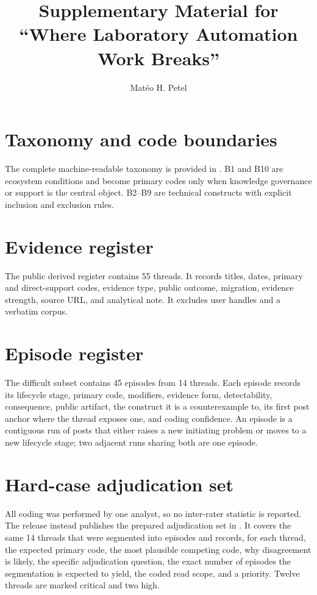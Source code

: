 \documentclass[preprint,12pt]{elsarticle}
\begin{document}
\begin{frontmatter}
\title{Supplementary Material for ``Where Laboratory Automation Work Breaks''}
\author{Mat\'eo H. Petel}
\end{frontmatter}

\renewcommand{\thetable}{S\arabic{table}}
\renewcommand{\thefigure}{S\arabic{figure}}
\renewcommand{\thesection}{S\arabic{section}}

\section{Taxonomy and code boundaries}
The complete machine-readable taxonomy is provided in . B1 and B10 are ecosystem conditions and become primary codes only when knowledge governance or support is the central object. B2--B9 are technical constructs with explicit inclusion and exclusion rules.

\section{Evidence register}
The public derived register contains 55 threads. It records titles, dates, primary and direct-support codes, evidence type, public outcome, migration, evidence strength, source URL, and analytical note. It excludes user handles and a verbatim corpus.



\section{Episode register}
The difficult subset contains 45 episodes from 14 threads. Each episode records its lifecycle stage, primary code, modifiers, evidence form, detectability, consequence, public artifact, the construct it is a counterexample to, its first post anchor where the thread exposes one, and coding confidence. An episode is a contiguous run of posts that either raises a new initiating problem or moves to a new lifecycle stage; two adjacent runs sharing both are one episode.

\section{Hard-case adjudication set}
\label{sec:s-adjudication}
All coding was performed by one analyst, so no inter-rater statistic is reported. The release instead publishes the prepared adjudication set in . It covers the same 14 threads that were segmented into episodes and records, for each thread, the expected primary code, the most plausible competing code, why disagreement is likely, the specific adjudication question, the exact number of episodes the segmentation is expected to yield, the coded read scope, and a priority. Twelve threads are marked critical and two high.
\end{document}
